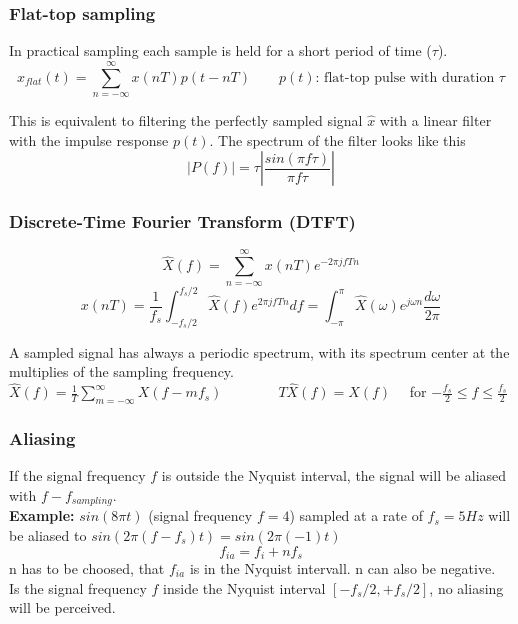 \begin{center}

\end{center}

\subsubsection{Flat-top sampling }
In practical sampling each sample is held for a short period of time ($\tau$).
\[ x_{flat}(t) =  \sum_{n=-\infty}^{\infty}x(nT)p(t - nT) \qquad p(t) \text{: flat-top pulse with duration } \tau \]

This is equivalent to filtering the perfectly sampled signal $\hat{x}$ with a linear filter with the impulse response $p(t)$.
The spectrum of the filter looks like this
\[ |P(f)| = \tau \left| \frac{sin(\pi f \tau)}{\pi f \tau} \right| \]

\subsubsection{Discrete-Time Fourier Transform (DTFT)}
\[
	\hat{X}(f) = \sum_{n=-\infty}^{\infty} x(nT)e^{-2\pi jfTn}
\]
\[
	x(nT) = \frac{1}{f_s} \int_{-f_s/2}^{f_s/2}\hat{X}(f)e^{2\pi jfTn}df = \int_{-\pi}^{\pi}\hat{X}(\omega)e^{j\omega n} \frac{d \omega}{2 \pi}
\]

  A sampled signal has always a periodic spectrum, with its spectrum center at the multiplies of the sampling frequency.\\
  $\hat{X}(f) = \frac{1}{T}\sum\limits_{m=-\infty}^{\infty}X(f-mf_s) \qquad \qquad
  T\hat{X}(f) = X(f) \quad$ for $-\frac{f_s}{2} \leq f \leq \frac{f_s}{2}$





\subsubsection{Aliasing}
If the signal frequency $f$ is outside the Nyquist interval, the signal will be
aliased with $f - f_{sampling}$.\\

\textbf{Example:} $sin(8\pi t)$ (signal frequency $f=4$) sampled at a rate of
$f_s=5Hz$ will be aliased to $sin(2\pi (f-f_s) t) = sin(2\pi (-1) t)$
\[ f_{ia} = f_i + nf_s \]
n has to be choosed, that $f_{ia}$ is in the Nyquist intervall. n can also be negative.\\


Is the signal frequency $f$ inside the Nyquist interval $\left[-f_s/2,+f_s/2\right]$, no aliasing will be
perceived.

